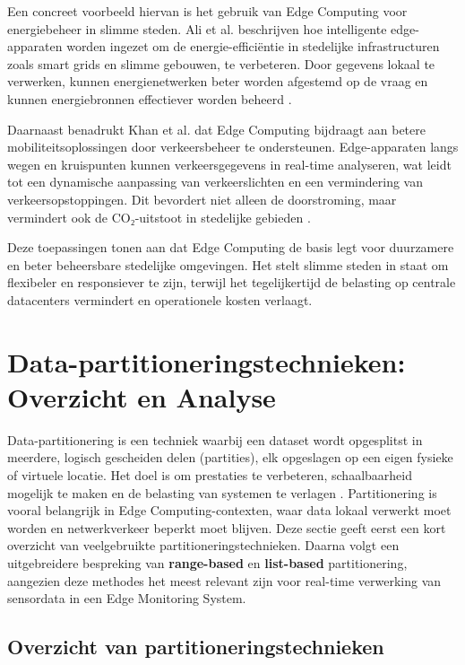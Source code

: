 Een concreet voorbeeld hiervan is het gebruik van Edge Computing voor energiebeheer in slimme steden. Ali et al. beschrijven hoe intelligente edge-apparaten worden ingezet om de energie-efficiëntie in stedelijke infrastructuren zoals smart grids en slimme gebouwen, te verbeteren. Door gegevens lokaal te verwerken, kunnen energienetwerken beter worden afgestemd op de vraag en kunnen energiebronnen effectiever worden beheerd \autocite{EnergyManagement2023}.
 
Daarnaast benadrukt Khan et al. dat Edge Computing bijdraagt aan betere mobiliteitsoplossingen door verkeersbeheer te ondersteunen. Edge-apparaten langs wegen en kruispunten kunnen verkeersgegevens in real-time analyseren, wat leidt tot een dynamische aanpassing van verkeerslichten en een vermindering van verkeersopstoppingen. Dit bevordert niet alleen de doorstroming, maar vermindert ook de CO₂-uitstoot in stedelijke gebieden \autocite{EdgeSmartCities2023}.
 
Deze toepassingen tonen aan dat Edge Computing de basis legt voor duurzamere en beter beheersbare stedelijke omgevingen. Het stelt slimme steden in staat om flexibeler en responsiever te zijn, terwijl het tegelijkertijd de belasting op centrale datacenters vermindert en operationele kosten verlaagt.

\section{Data-partitioneringstechnieken: Overzicht en Analyse}

Data-partitionering is een techniek waarbij een dataset wordt opgesplitst in meerdere, logisch gescheiden delen (partities), elk opgeslagen op een eigen fysieke of virtuele locatie. Het doel is om prestaties te verbeteren, schaalbaarheid mogelijk te maken en de belasting van systemen te verlagen \cite{Kleppmann2017}. Partitionering is vooral belangrijk in Edge Computing-contexten, waar data lokaal verwerkt moet worden en netwerkverkeer beperkt moet blijven.
Deze sectie geeft eerst een kort overzicht van veelgebruikte partitioneringstechnieken. Daarna volgt een uitgebreidere bespreking van \textbf{range-based} en \textbf{list-based} partitionering, aangezien deze methodes het meest relevant zijn voor real-time verwerking van sensordata in een Edge Monitoring System.

\subsection{Overzicht van partitioneringstechnieken}

